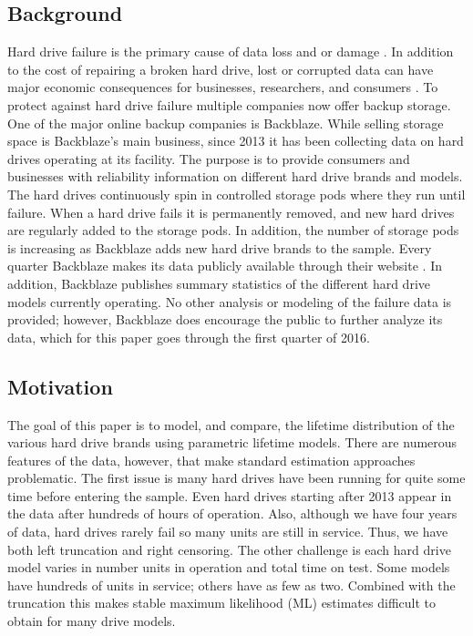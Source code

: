 \documentclass[12pt]{article}
\begin{document}
\subsection{Background}

Hard drive failure is the primary cause of data loss and or damage \cite{harris}.  In addition to the cost of repairing a broken hard drive, lost or corrupted data can have major economic consequences for businesses, researchers, and consumers \cite{smith}.  To protect against hard drive failure multiple companies now offer backup storage.  One of the major online backup companies is Backblaze.  While selling storage space is Backblaze's main business, since 2013 it has been collecting data on hard drives operating at its facility.  The purpose is to provide consumers and businesses with reliability information on different hard drive brands and models.  The hard drives continuously spin in controlled storage pods where they run until failure.  When a hard drive fails it is permanently removed, and new hard drives are regularly added to the storage pods.  In addition, the number of storage pods is increasing as Backblaze adds new hard drive brands to the sample.  Every quarter Backblaze makes its data publicly available through their website \cite{backblaze}. In addition, Backblaze publishes summary statistics of the different hard drive models currently operating.  No other analysis or modeling of the failure data is provided; however, Backblaze does encourage the public to further analyze its data, which for this paper goes through the first quarter of 2016.
 
 
\subsection{Motivation}
The goal of this paper is to model, and compare, the lifetime distribution of the various hard drive brands using parametric lifetime models.  There are numerous features of the data, however, that make standard estimation approaches problematic.  The first issue is many hard drives have been running for quite some time before entering the sample.  Even hard drives starting after 2013 appear in the data after hundreds of hours of operation.  Also, although we have four years of data, hard drives rarely fail so many units are still in service.  Thus, we have both left truncation and right censoring.  The other challenge is each hard drive model varies in number units in operation and total time on test.  Some models have hundreds of units in service; others have as few as two.  Combined with the truncation this makes stable maximum likelihood (ML) estimates difficult to obtain for many drive models. \\
\end{document}
